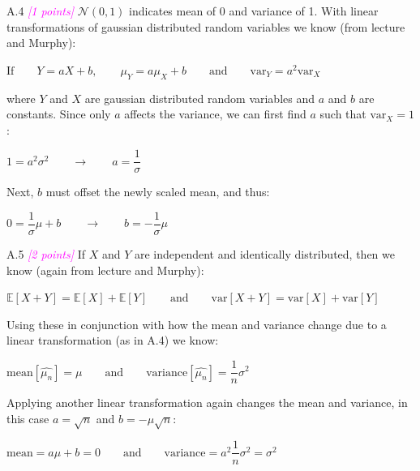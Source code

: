 \documentclass{article}
\newcommand{\1}{\mathbf{1}}
\newcommand{\E}{\mathbb{E}}
\newcommand{\points}[1]{\small\textcolor{magenta}{\emph{[#1 points]}} \normalsize}
\begin{document}
A.4 \points{1} $\mathcal{N}(0,1)$ indicates mean of 0 and variance of 1. With linear transformations of gaussian distributed random variables we know (from lecture and Murphy):
\begin{center}
	$\text{If} \qquad Y=aX+b, \qquad \mu_Y=a\mu_X+b \qquad \text{and} \qquad \text{var}_Y=a^2\text{var}_X$
\end{center}
where $Y$ and $X$ are gaussian distributed random variables and $a$ and $b$ are constants. Since only $a$ affects the variance, we can first find $a$ such that $\text{var}_X=1$:
\begin{center}
	$1=a^2\sigma^2 \qquad \rightarrow \qquad a=\dfrac{1}{\sigma}$
\end{center}
Next, $b$ must offset the newly scaled mean, and thus:
\begin{center}
	$0=\dfrac{1}{\sigma}\mu+b \qquad \rightarrow \qquad b=-\dfrac{1}{\sigma}\mu$
\end{center}

A.5 \points{2} If $X$ and $Y$ are independent and identically distributed, then we know (again from lecture and Murphy):
\begin{center}
	$\E[X+Y]=\E[X]+\E[Y] \qquad \text{and} \qquad \text{var}[X+Y]=\text{var}[X]+\text{var}[Y]$
\end{center}
Using these in conjunction with how the mean and variance change due to a linear transformation (as in A.4) we know:
\begin{center}
	$\text{mean}[\hat{\mu_n}]=\mu \qquad \text{and} \qquad \text{variance}[\hat{\mu_n}]=\dfrac{1}{n}\sigma^2$
\end{center}
Applying another linear transformation again changes the mean and variance, in this case $a=\sqrt{n}$ and $b=-\mu\sqrt{n}$:
\begin{center}
	$\text{mean}=a\mu+b=0 \qquad \text{and} \qquad \text{variance}=a^2\dfrac{1}{n}\sigma^2=\sigma^2$
\end{center}
\end{document}
